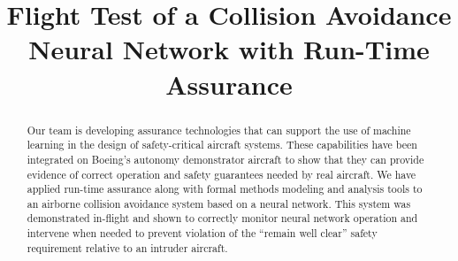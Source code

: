 \documentclass[conference]{IEEEtran}
\begin{document}
\title{Flight Test of a Collision Avoidance Neural Network with Run-Time Assurance
}

\author{
\and
{}
\and
{}
}

\maketitle

\begin{abstract}
Our team is developing assurance
technologies that can support the use of machine learning in the design of safety-critical aircraft
systems. These capabilities have been integrated on Boeing's autonomy demonstrator aircraft to show
that they can provide evidence of correct operation and safety guarantees needed by real aircraft.
We have applied run-time assurance along with formal methods modeling and analysis tools to an
airborne collision avoidance system based on a neural network. This system was demonstrated
in-flight and shown to correctly monitor neural network operation and intervene when needed to
prevent violation of the “remain well clear” safety requirement relative to an intruder aircraft.
\end{abstract}
\end{document}
